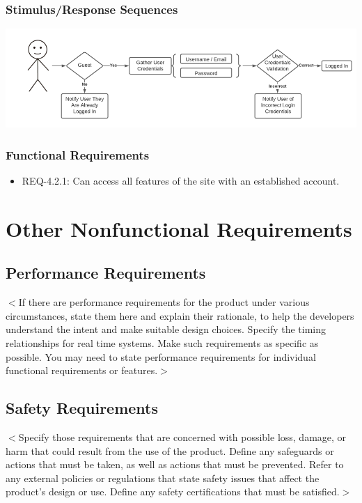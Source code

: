 \documentclass{scrreprt}
\begin{document}
\subsection{Stimulus/Response Sequences}

\includegraphics{FlowCharts/Security-Login.png}

\subsection{Functional Requirements}

\begin{itemize}
    \item REQ-4.2.1: Can access all features of the site with an established account. 
\end{itemize}

\chapter{Other Nonfunctional Requirements}

\section{Performance Requirements}
$<$If there are performance requirements for the product under various 
circumstances, state them here and explain their rationale, to help the 
developers understand the intent and make suitable design choices. Specify the 
timing relationships for real time systems. Make such requirements as specific 
as possible. You may need to state performance requirements for individual 
functional requirements or features.$>$

\section{Safety Requirements}
$<$Specify those requirements that are concerned with possible loss, damage, or 
harm that could result from the use of the product. Define any safeguards or 
actions that must be taken, as well as actions that must be prevented. Refer to 
any external policies or regulations that state safety issues that affect the 
product’s design or use. Define any safety certifications that must be 
satisfied.$>$
\end{document}
